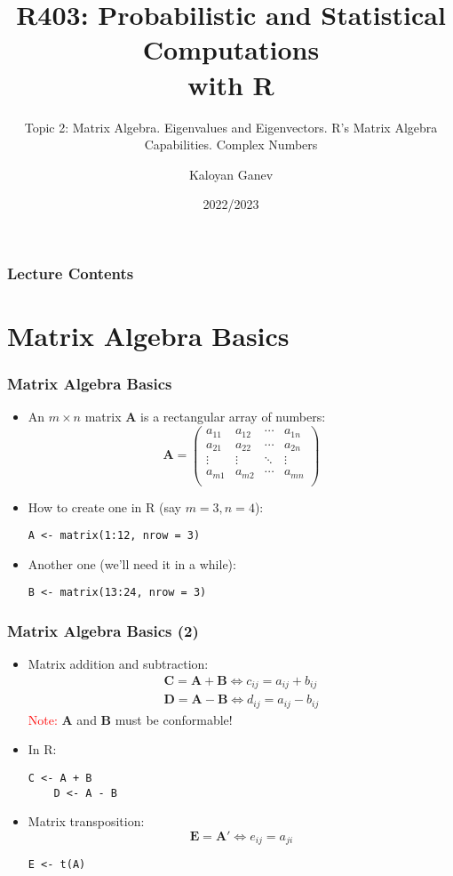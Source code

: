 \documentclass[10pt]{beamer}
\title{R403: Probabilistic and Statistical Computations\\ with R}
\subtitle{Topic 2: \textcolor{myred}{Matrix Algebra. Eigenvalues and Eigenvectors. R's Matrix Algebra Capabilities. Complex Numbers}}
\author{Kaloyan Ganev}
\date{2022/2023}
\theoremstyle{definition}
\begin{document}
\maketitle

\begin{frame}[fragile]
\frametitle{Lecture Contents}
\tableofcontents
\end{frame}  

\section{Matrix Algebra Basics}
\begin{frame}[fragile]
\frametitle{Matrix Algebra Basics}
\begin{itemize}
	\item An $m\times n$ matrix $\mathbf{A}$ is a rectangular array of numbers:
	\[
		\mathbf{A} = 
		\begin{pmatrix}
			a_{11} & a_{12} & \cdots & a_{1n}\\
			a_{21} & a_{22} & \cdots & a_{2n}\\
			\vdots & \vdots & \ddots & \vdots\\
			a_{m1} & a_{m2} & \cdots & a_{mn}\\
		\end{pmatrix}
	\]
	\item How to create one in R (say $m = 3, n = 4$):
	\begin{lstlisting}[style = rstyle, breaklines]
	A <- matrix(1:12, nrow = 3)	
	\end{lstlisting}
	\item Another one (we'll need it in a while):
	\begin{lstlisting}[style = rstyle, breaklines]
	B <- matrix(13:24, nrow = 3)	
	\end{lstlisting}
\end{itemize}
\end{frame}

\begin{frame}[fragile]
\frametitle{Matrix Algebra Basics (2)}
\begin{itemize}
	\item Matrix addition and subtraction:
	\[
		\begin{array}{lcl}
			\mathbf{C} = \mathbf{A + B} \Leftrightarrow c_{ij} = a_{ij} + b_{ij}\\
			\mathbf{D} = \mathbf{A - B} \Leftrightarrow d_{ij} = a_{ij} - b_{ij}
		\end{array}
	\]
	\textcolor{red}{Note:} $\mathbf{A}$ and $\mathbf{B}$ must be conformable!
	\item In R:
	\begin{lstlisting}[style = rstyle, breaklines]
	C <- A + B
	D <- A - B	
	\end{lstlisting}
	\item Matrix transposition:
	\[
		\mathbf{E} = \mathbf{A}' \Leftrightarrow e_{ij} = a_{ji}
	\]
	\begin{lstlisting}[style = rstyle, breaklines]
	E <- t(A)	
	\end{lstlisting}
\end{itemize}
\end{frame}
\end{document}
